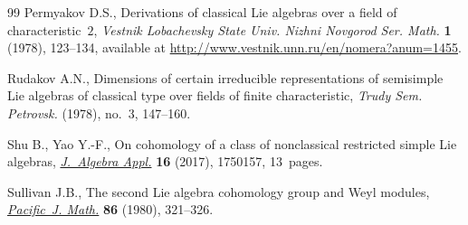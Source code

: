 \begin{thebibliography}{99}
Permyakov D.S., Derivations of classical {L}ie algebras over a field of
 characteristic~$2$, \textit{Vestnik Lobachevsky State Univ. Nizhni Novgorod
 Ser. Math.} \textbf{1} (1978), 123--134, available at
 \url{http://www.vestnik.unn.ru/en/nomera?anum=1455}.

Rudakov A.N., Dimensions of certain irreducible representations of semisimple
 {L}ie algebras of classical type over fields of finite characteristic,
 \textit{Trudy Sem. Petrovsk.} (1978), no.~3, 147--160.

Shu B., Yao Y.-F., On cohomology of a class of nonclassical restricted simple
 {L}ie algebras, \href{https://doi.org/10.1142/S0219498817501572}{\textit{J.~Algebra Appl.}} \textbf{16} (2017), 1750157,
 13~pages.

Sullivan J.B., The second {L}ie algebra cohomology group and {W}eyl modules,
 \href{https://doi.org/10.2140/pjm.1980.86.321}{\textit{Pacific~J. Math.}} \textbf{86} (1980), 321--326.

\end{thebibliography}
